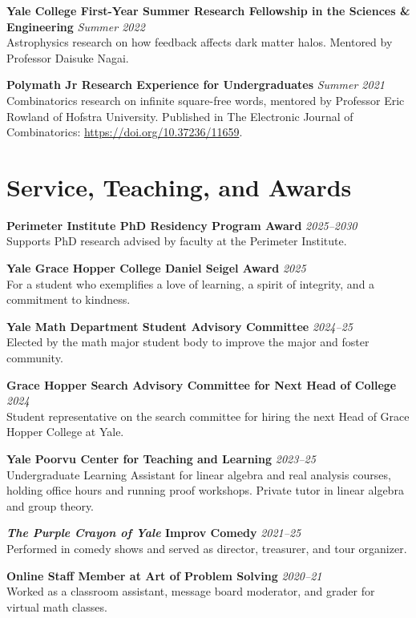\documentclass[11pt]{article}
\newcommand{\entry}[3]{
    \vspace{-.58em}
    \textbf{#1} \hfill \textit{#2} \\
    #3 \vspace{0.5em}}
\begin{document}
\entry{Yale College First-Year Summer Research Fellowship in the Sciences \& Engineering}{Summer 2022}{
Astrophysics research on how feedback affects dark matter halos. Mentored by Professor Daisuke Nagai.
}

\entry{Polymath Jr Research Experience for Undergraduates}{Summer 2021}{
Combinatorics research on infinite square-free words, mentored by Professor Eric Rowland of Hofstra University. Published in The Electronic Journal of Combinatorics: \href{https://doi.org/10.37236/11659}{https://doi.org/10.37236/11659}.
}


\section*{Service, Teaching, and Awards}
\vspace{0.58em}
\vspace{-0.1em}

\entry{Perimeter Institute PhD Residency Program Award}{2025--2030}{
Supports PhD research advised by faculty at the Perimeter Institute.
}

\entry{Yale Grace Hopper College Daniel Seigel Award}{2025}{
For a student who exemplifies a love of learning, a spirit of integrity, and a commitment to kindness.
}

\entry{Yale Math Department Student Advisory Committee}{2024--25}{
Elected by the math major student body to improve the major and foster community.
}

\entry{Grace Hopper Search Advisory Committee for Next Head of College}{2024}{
Student representative on the search committee for hiring the next Head of Grace Hopper College at Yale.
}

\entry{Yale Poorvu Center for Teaching and Learning}{2023--25}{
Undergraduate Learning Assistant for linear algebra and real analysis courses, holding office hours and running proof workshops. Private tutor in linear algebra and group theory.
}

\entry{\textit{The Purple Crayon of Yale} Improv Comedy}{2021--25}{
Performed in comedy shows and served as director, treasurer, and tour organizer.
}

\entry{Online Staff Member at Art of Problem Solving}{2020--21}{
Worked as a classroom assistant, message board moderator, and grader for virtual math classes.
}
\end{document}
